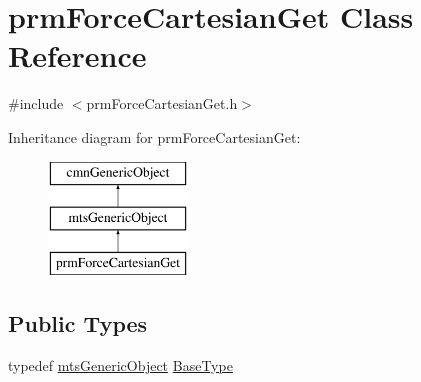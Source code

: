 \hypertarget{classprm_force_cartesian_get}{\section{prm\-Force\-Cartesian\-Get Class Reference}
\label{classprm_force_cartesian_get}
}


{\ttfamily \#include $<$prm\-Force\-Cartesian\-Get.\-h$>$}

Inheritance diagram for prm\-Force\-Cartesian\-Get\-:\begin{figure}[H]
\begin{center}
\leavevmode
\includegraphics[height=3.000000cm]{d6/d8c/classprm_force_cartesian_get}
\end{center}
\end{figure}
\subsection*{Public Types}
\begin{DoxyCompactItemize}
\item 
typedef \hyperlink{classmts_generic_object}{mts\-Generic\-Object} \hyperlink{classprm_force_cartesian_get_ac1f56480b9858aece8a2cc7bb2b87e6c}{Base\-Type}
\end{DoxyCompactItemize}
